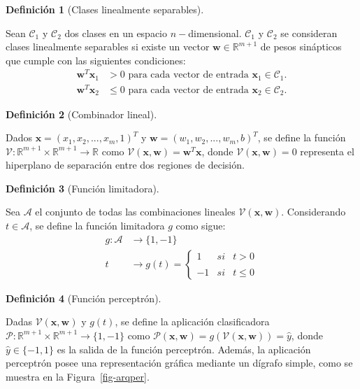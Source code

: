 \documentclass[
  us-letterpaper,
]{scrreprt}
\theoremstyle{plain}
\theoremstyle{definition}
\theoremstyle{plain}
\theoremstyle{definition}
\newtheorem{definition}{Definición}[chapter]
\theoremstyle{remark}
\begin{document}
\begin{definition}[Clases linealmente
separables]\protect\hypertarget{def-cls}{}\label{def-cls}

Sean \(\mathscr C_1\) y \(\mathscr C_2\) dos clases en un espacio
\(n-\)dimensional. \(\mathscr C_1\) y \(\mathscr C_2\) se consideran
clases linealmente separables si existe un vector
\(\mathbf w \in \mathbb R^{m+1}\) de pesos sinápticos que cumple con las
siguientes condiciones: \[
\begin{split}
\mathbf w^T \mathbf x_1 &> 0\text{ para cada vector de entrada } \mathbf x_1 \in \mathscr C_1.\\
\mathbf w^T \mathbf x_2 &\leq 0\text{ para cada vector de entrada } \mathbf x_2 \in \mathscr C_2.
\end{split}
\]

\end{definition}

\begin{definition}[Combinador
lineal]\protect\hypertarget{def-comlin}{}\label{def-comlin}

Dados \(\mathbf x = (x_1, x_2,..., x_m,1)^T\) y
\(\mathbf w = (w_1,w_2,...,w_m,b)^T\), se define la función
\(\mathcal V: \mathbb R^{m+1}\times\mathbb R^{m+1} \rightarrow \mathbb R\)
como \(\mathcal V(\mathbf x, \mathbf w) = \mathbf w^T\mathbf x\), donde
\(\mathcal V(\mathbf x, \mathbf w) = 0\) representa el hiperplano de
separación entre dos regiones de decisión.

\end{definition}

\begin{definition}[Función
limitadora]\protect\hypertarget{def-flim}{}\label{def-flim}

Sea \(\mathscr A\) el conjunto de todas las combinaciones lineales
\(\mathcal V(\mathbf x, \mathbf w)\). Considerando \(t \in \mathscr A\),
se define la función limitadora \(g\) como sigue: \[
\begin{split}
g: \mathscr A&\rightarrow \{1,-1\}\\
t &\rightarrow g(t)= \left\{\begin{array}{lcc} 1 & si & t> 0\\ \\-1 & si & t\leq 0\end{array}\right.
\end{split}
\]

\end{definition}

\begin{definition}[Función
perceptrón]\protect\hypertarget{def-fper}{}\label{def-fper}

Dadas \(\mathcal V(\mathbf x, \mathbf w)\) y \(g(t)\), se define la
aplicación clasificadora
\(\mathscr P: \mathbb R^{m+1}\times \mathbb R^{m+1} \rightarrow \{1,-1\}\)
como
\(\mathscr P(\mathbf x, \mathbf w)=g(\mathcal V(\mathbf x, \mathbf w))=\hat{y}\),
donde \(\hat{y}\in \{-1,1\}\) es la salida de la función perceptrón.
Además, la aplicación perceptrón posee una representación gráfica
mediante un dígrafo simple, como se muestra en la
Figura~\ref{fig-arqper}.

\end{definition}
\end{document}
